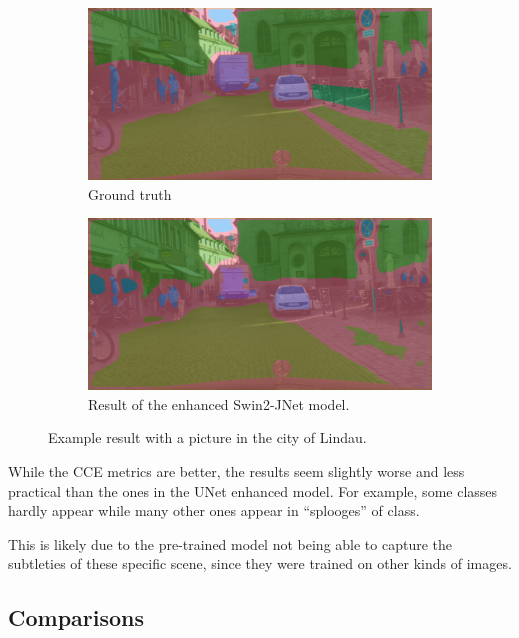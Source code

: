 \begin{figure}[h]
	\begin{subfigure}{.5\textwidth}
		\includegraphics[width=\textwidth]{city_images/swin2_gt_pic.png}
		\caption{Ground truth}
	\end{subfigure}
	\begin{subfigure}{.5\textwidth}
		\includegraphics[width=\textwidth]{city_images/swin2_pic.png}
		\caption{Result of the enhanced Swin2-JNet model.}
	\end{subfigure}
	\caption{Example result with a picture in the city of Lindau.}
\end{figure}

While the CCE metrics are better, the results seem slightly worse and less practical than the ones in the UNet enhanced model.
For example, some classes hardly appear while many other ones appear in ``splooges'' of class.

This is likely due to the pre-trained model not being able to capture the subtleties of these specific scene, since they were trained on other kinds of images.

\newpage{}

\subsection{Comparisons}
\label{comparison_section}

